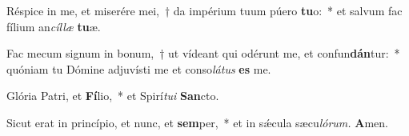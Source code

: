 \item Réspice in me, et miserére mei,~† da impérium tuum púero \textbf{tu}o:~* et salvum fac fílium an\textit{cíllæ} \textbf{tu}æ.
\item Fac mecum signum in bonum,~† ut vídeant qui odérunt me, et confun\textbf{dán}tur:~* quóniam tu Dómine adjuvísti me et conso\hspace{0.03em}\textit{látus} \textbf{es} me.
\item Glória Patri, et \textbf{Fí}lio,~* et Spirí\hspace{0.03em}\textit{tui} \textbf{San}cto.
\item Sicut erat in princípio, et nunc, et \textbf{sem}per,~* et in sǽcula sæcu\hspace{0.03em}\textit{lórum.} \textbf{A}men.

